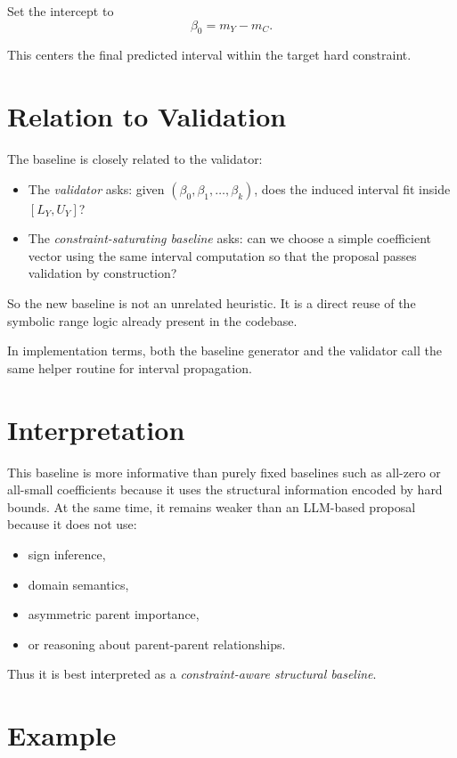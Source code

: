 \documentclass[11pt]{article}
\begin{document}
Set the intercept to
\[
\beta_0 = m_Y - m_C.
\]

This centers the final predicted interval within the target hard constraint.

\section{Relation to Validation}

The baseline is closely related to the validator:

\begin{itemize}
    \item The \emph{validator} asks: given $(\beta_0, \beta_1, \dots, \beta_k)$, does the induced interval fit inside $[L_Y, U_Y]$?
    \item The \emph{constraint-saturating baseline} asks: can we choose a simple coefficient vector using the same interval computation so that the proposal passes validation by construction?
\end{itemize}

So the new baseline is not an unrelated heuristic. It is a direct reuse of the symbolic range logic already present in the codebase.

In implementation terms, both the baseline generator and the validator call the same helper routine for interval propagation.

\section{Interpretation}

This baseline is more informative than purely fixed baselines such as all-zero or all-small coefficients because it uses the structural information encoded by hard bounds. At the same time, it remains weaker than an LLM-based proposal because it does not use:

\begin{itemize}
    \item sign inference,
    \item domain semantics,
    \item asymmetric parent importance,
    \item or reasoning about parent-parent relationships.
\end{itemize}

Thus it is best interpreted as a \emph{constraint-aware structural baseline}.

\section{Example}
\end{document}
